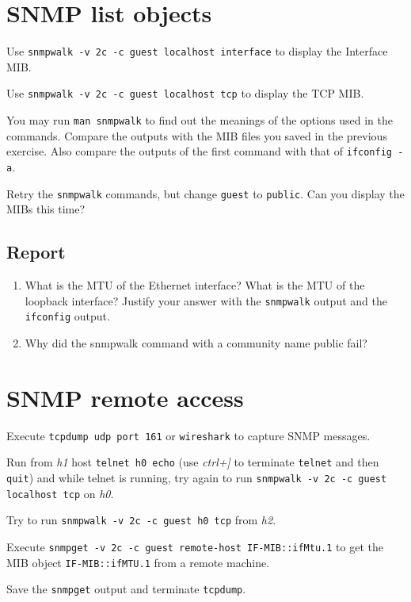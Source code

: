 \documentclass{../UTNetLab}
\begin{document}
\section{SNMP list objects}
	Use \lstinline{snmpwalk -v 2c -c guest localhost interface} to display the Interface MIB.

	Use \lstinline{snmpwalk -v 2c -c guest localhost tcp} to display the TCP MIB.

	You may run \lstinline{man snmpwalk} to find out the meanings of the options used in the commands. Compare the outputs with the MIB files you saved in the previous exercise. Also compare the outputs of the first command with that of \lstinline{ifconfig -a}.

	Retry the \lstinline{snmpwalk} commands, but change \lstinline{guest} to \lstinline{public}. Can you display the MIBs this time?
	
	\subsection*{Report}
	\begin{enumerate}
		\item What is the MTU of the Ethernet interface? What is the MTU of the loopback interface? Justify your answer with the \lstinline{snmpwalk} output and the \lstinline{ifconfig} output.
		\item Why did the snmpwalk command with a community name public fail?
	\end{enumerate}

\section{SNMP remote access}
	Execute \lstinline{tcpdump udp port 161} or \lstinline{wireshark} to capture SNMP messages.

	Run from \textit{h1} host \lstinline[emph={h0}]{telnet h0 echo} (use \textit{ctrl+]} to terminate \lstinline{telnet} and then \lstinline{quit}) and while telnet is running, try again to run \lstinline{snmpwalk -v 2c -c guest localhost tcp} on \textit{h0}.

	Try to run \lstinline[emph={h0}]{snmpwalk -v 2c -c guest h0 tcp} from \textit{h2}.

	Execute \lstinline[emph={your-host, remote-host}]{snmpget -v 2c -c guest remote-host IF-MIB::ifMtu.1} to get the MIB object \texttt{IF-MIB::ifMTU.1} from a remote machine.

	Save the \lstinline{snmpget} output and terminate \lstinline{tcpdump}.
\end{document}
